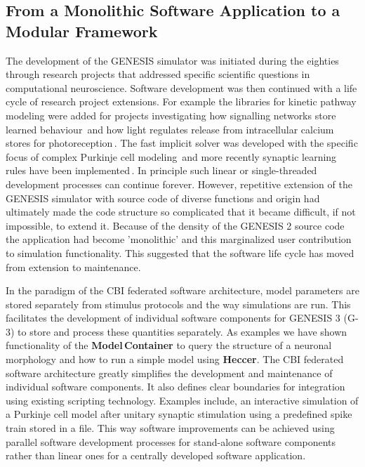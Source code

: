 \documentclass[12pt]{article}
\begin{document}
\subsection{From a Monolithic Software Application to a Modular
  Framework}
\label{sec:from-monol-softw}
The development of the GENESIS simulator was initiated during the
eighties through research projects that addressed specific scientific
questions in computational neuroscience.  Software development was
then continued with a life cycle of research project extensions.  For
example the libraries for kinetic pathway modeling were added for
projects investigating how signalling networks store learned
behaviour\,\cite{bhalla99:_emerg} and how light regulates release from
intracellular calcium stores for
photoreception\,\cite{blackwell00:_eviden_distin_light_induc_calcium}.
The fast implicit solver was developed with the specific focus of
complex Purkinje cell modeling\,\cite{deschutter94:_purkin_i,
  deschutter94:_purkin_ii} and more recently synaptic learning rules
have been
implemented\,\cite{guenay08:_chann_densit_distr_explain_spikin}.  In
principle such linear or single-threaded development processes can
continue forever.  However, repetitive extension of the GENESIS
simulator with source code of diverse functions and origin had
ultimately made the code structure so complicated that it became
difficult, if not impossible, to extend it.  Because of the density of
the GENESIS 2 source code the application had become 'monolithic' and
this marginalized user contribution to simulation functionality.  This
suggested that the software life cycle has moved from extension to
maintenance.

In the paradigm of the CBI federated software architecture, model
parameters are stored separately from stimulus protocols and the way
simulations are run.  This facilitates the development of individual
software components for GENESIS 3 (G-3) to store and process these
quantities separately.  As examples we have shown functionality of the
{\bf Model\,Container} to query the structure of a neuronal morphology
and how to run a simple model using {\bf Heccer}.  The CBI federated
software architecture greatly simplifies the development and
maintenance of individual software components.  It also defines clear
boundaries for integration using existing scripting technology.
Examples include, an interactive simulation of a Purkinje cell model
after unitary synaptic stimulation using a predefined spike train
stored in a file.  This way software improvements can be achieved
using parallel software development processes for stand-alone software
components rather than linear ones for a centrally developed software
application.
\end{document}
